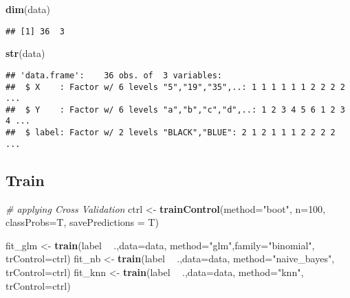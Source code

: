 \documentclass[
]{article}
\newenvironment{Shaded}{\begin{snugshade}}{\end{snugshade}}
\newcommand{\CommentTok}[1]{\textcolor[rgb]{0.56,0.35,0.01}{\textit{#1}}}
\newcommand{\DataTypeTok}[1]{\textcolor[rgb]{0.13,0.29,0.53}{#1}}
\newcommand{\DecValTok}[1]{\textcolor[rgb]{0.00,0.00,0.81}{#1}}
\newcommand{\KeywordTok}[1]{\textcolor[rgb]{0.13,0.29,0.53}{\textbf{#1}}}
\newcommand{\NormalTok}[1]{#1}
\newcommand{\OperatorTok}[1]{\textcolor[rgb]{0.81,0.36,0.00}{\textbf{#1}}}
\newcommand{\StringTok}[1]{\textcolor[rgb]{0.31,0.60,0.02}{#1}}
\begin{document}
\begin{Shaded}
\begin{Highlighting}[]
\KeywordTok{dim}\NormalTok{(data)}
\end{Highlighting}
\end{Shaded}

\begin{verbatim}
## [1] 36  3
\end{verbatim}

\begin{Shaded}
\begin{Highlighting}[]
\KeywordTok{str}\NormalTok{(data)}
\end{Highlighting}
\end{Shaded}

\begin{verbatim}
## 'data.frame':    36 obs. of  3 variables:
##  $ X    : Factor w/ 6 levels "5","19","35",..: 1 1 1 1 1 1 2 2 2 2 ...
##  $ Y    : Factor w/ 6 levels "a","b","c","d",..: 1 2 3 4 5 6 1 2 3 4 ...
##  $ label: Factor w/ 2 levels "BLACK","BLUE": 2 1 2 1 1 1 2 2 2 2 ...
\end{verbatim}

\hypertarget{train}{%
\subsection{Train}\label{train}}

\begin{Shaded}
\begin{Highlighting}[]
\CommentTok{#  applying Cross Validation}
\NormalTok{ctrl <-}\StringTok{ }\KeywordTok{trainControl}\NormalTok{(}\DataTypeTok{method=}\StringTok{"boot"}\NormalTok{, }\DataTypeTok{n=}\DecValTok{100}\NormalTok{, }\DataTypeTok{classProbs=}\NormalTok{T,  }\DataTypeTok{savePredictions =}\NormalTok{ T)}

\NormalTok{fit_glm <-}\StringTok{ }\KeywordTok{train}\NormalTok{(label }\OperatorTok{~}\StringTok{ }\NormalTok{.,}\DataTypeTok{data=}\NormalTok{data, }\DataTypeTok{method=}\StringTok{"glm"}\NormalTok{,}\DataTypeTok{family=}\StringTok{"binomial"}\NormalTok{, }\DataTypeTok{trControl=}\NormalTok{ctrl)}
\NormalTok{fit_nb <-}\StringTok{ }\KeywordTok{train}\NormalTok{(label }\OperatorTok{~}\StringTok{ }\NormalTok{.,}\DataTypeTok{data=}\NormalTok{data, }\DataTypeTok{method=}\StringTok{"naive_bayes"}\NormalTok{, }\DataTypeTok{trControl=}\NormalTok{ctrl)}
\NormalTok{fit_knn <-}\StringTok{ }\KeywordTok{train}\NormalTok{(label }\OperatorTok{~}\StringTok{ }\NormalTok{.,}\DataTypeTok{data=}\NormalTok{data, }\DataTypeTok{method=}\StringTok{"knn"}\NormalTok{, }\DataTypeTok{trControl=}\NormalTok{ctrl)}
\end{Highlighting}
\end{Shaded}
\end{document}
